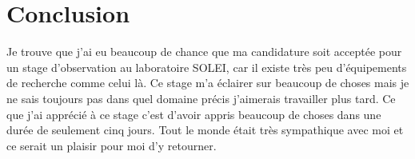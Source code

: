 





			
	\chapter*{Conclusion}
		
       Je trouve que j'ai eu beaucoup de chance que ma candidature soit acceptée pour un stage d'observation au laboratoire SOLEI, car il existe très peu d'équipements de recherche comme celui là. Ce stage m'a éclairer sur beaucoup de choses mais je ne sais toujours pas dans quel domaine précis j'aimerais travailler plus tard. Ce que j'ai apprécié à ce stage c'est d'avoir appris beaucoup de choses dans une durée de seulement cinq jours.
       Tout le monde était très sympathique avec moi et ce serait un plaisir pour moi d'y retourner.

